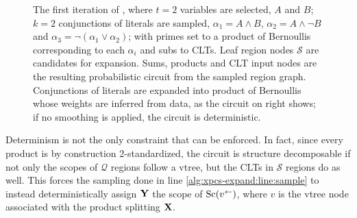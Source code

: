 \begin{figure}[t]
  \caption{The first iteration of , where $t=2$ variables are selected, $A$ and $B$;
    $k=2$ conjunctions of literals are sampled, $\alpha_1=A\wedge B$, $\alpha_2=A\wedge\neg B$ and
    $\alpha_3=\neg(\alpha_1\vee\alpha_2)$; with primes set to a product of Bernoullis corresponding
    to each $\alpha_i$ and subs to CLTs. Leaf region nodes $\mathcal{S}$ are candidates for
    expansion. Sums, products and CLT input nodes are the resulting probabilistic circuit from the
    sampled region graph. Conjunctions of literals are expanded into product of Bernoullis whose
    weights are inferred from data, as the circuit on right shows; if no smoothing is applied, the
    circuit is deterministic.}
  \label{fig:xpcs}
\end{figure}

Determinism is not the only constraint that can be enforced. In fact, since every product is by
construction 2-standardized, the circuit is structure decomposable if not only the scopes of
$\mathcal{Q}$ regions follow a vtree, but the CLTs in $\mathcal{S}$ regions do as well. This forces
the sampling done in line \ref{alg:xpcs-expand:line:sample} to instead deterministically assign
$\mathbf{Y}$ the scope of $\operatorname*{\normalfont{Sc}}(v^\gets)$, where $v$ is the vtree node associated with the product
splitting $\mathbf{X}$.

